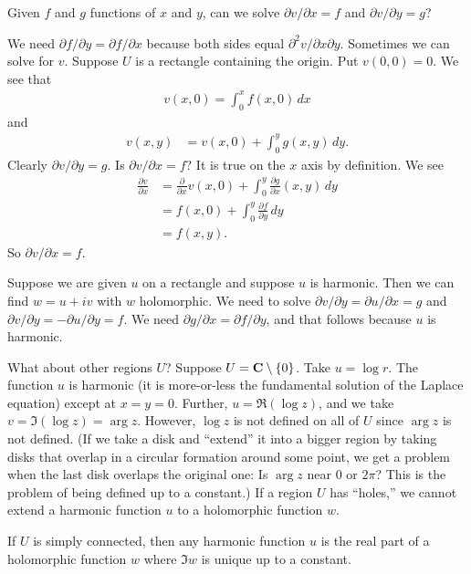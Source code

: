 \documentclass[11pt, oneside,margin=1in]{article}
\begin{document}
\begin{problem}
	Given $f$ and $g$ functions of $x$ and $y$, can we solve $\partial v/\partial x = f$ and $\partial v/\partial y = g$?
\end{problem}

We need $\partial f/\partial y = \partial f/\partial x$ because both sides equal $\partial^2 v/\partial x\partial y$. Sometimes we can solve for $v$. Suppose $U$ is a rectangle containing the origin. Put $v(0,0)=0$. We see that
\begin{align*}
	v(x,0) =  \int_{0}^{x} f(x,0)   \, dx 
\end{align*}
and
\begin{align*}
	v(x,y) &= v (x,0) +  \int_{0}^{y} g(x,y)  \, dy. 
\end{align*}
Clearly $\partial v/\partial y=g$. Is $\partial v/\partial x = f$? It is true on the $x$ axis by definition. We see
\begin{align*}
	\frac{\partial v}{\partial x} &= \frac{\partial}{\partial x} v(x,0) +  \int_{0}^{y} \frac{\partial g}{\partial x}(x,y)  \, dy\\
				      &= f(x,0) +  \int_{0}^{y} \frac{\partial f}{\partial y}  \, dy\\
				      &= f(x,y).
\end{align*}
So $\partial v/\partial x = f$.

Suppose we are given $u$ on a rectangle and suppose $u$ is harmonic. Then we can find $w=u+iv$ with $w$ holomorphic. We need to solve $\partial v/\partial y =\partial u /\partial x = g$ and $\partial v/\partial y = -\partial u/\partial y = f$. We need $\partial g/\partial x = \partial f/\partial y$, and that follows because $u$ is harmonic.

What about other regions $U$? Suppose $U = \mathbf C\setminus\{0\}$. Take $u=\log r$. The function $u$ is harmonic (it is more-or-less the fundamental solution of the Laplace equation) except at $x=y=0$. Further, $u = \Re (\log z)$, and we take $v = \Im(\log z) = \arg z$. However, $\log z$ is not defined on all of $U$ since $\arg z$ is not defined. (If we take a disk and ``extend'' it into a bigger region by taking disks that overlap in a circular formation around some point, we get a problem when the last disk overlaps the original one: Is $\arg z$ near $0$ or $2\pi$? This is the problem of being defined up to a constant.) If a region $U$ has ``holes,'' we cannot extend a harmonic function $u$ to a holomorphic function $w$. 

If $U$ is simply connected, then any harmonic function $u$ is the real part of a holomorphic function $w$ where $\Im w$ is unique up to a constant.
\end{document}
